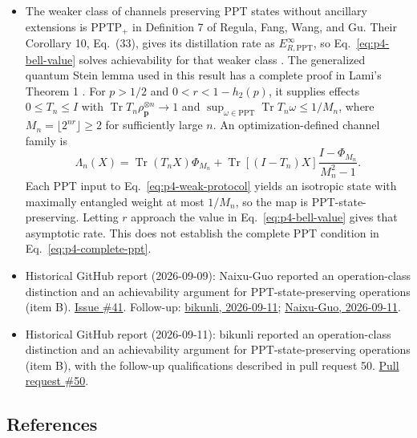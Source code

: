 \begin{itemize}
  \item The weaker class of channels preserving PPT states without ancillary
extensions is $\mathrm{PPTP}_+$ in Definition 7 of Regula, Fang, Wang,
and Gu. Their Corollary 10, Eq.~(33), gives its distillation rate as
$E_{R,\mathrm{PPT}}^\infty$, so Eq.~\eqref{eq:p4-bell-value} solves
achievability for that weaker class
.
The generalized quantum Stein lemma used in this result has a complete
proof in Lami's Theorem 1 .
For $p>1/2$ and $0<r<1-h_2(p)$, it supplies effects $0\leq T_n\leq I$
with $\operatorname{Tr}T_n\rho_{\mathbf p}^{\otimes n}\to1$ and
$\sup_{\omega\in\mathrm{PPT}}\operatorname{Tr}T_n\omega\leq1/M_n$,
where $M_n=\lfloor2^{nr}\rfloor\geq2$ for sufficiently large $n$.
An optimization-defined channel family is
\begin{equation}
  \Lambda_n(X)=\operatorname{Tr}(T_nX)\Phi_{M_n}
   +\operatorname{Tr}[(I-T_n)X]
        \frac{I-\Phi_{M_n}}{M_n^2-1}.
  \label{eq:p4-weak-protocol}
\end{equation}
Each PPT input to Eq.~\eqref{eq:p4-weak-protocol} yields an isotropic state
with maximally entangled weight at most $1/M_n$, so the map is
PPT-state-preserving. Letting $r$ approach the value in
Eq.~\eqref{eq:p4-bell-value} gives that asymptotic rate. This does not
establish the complete PPT condition in Eq.~\eqref{eq:p4-complete-ppt}.

  \item Historical GitHub report (2026-09-09): Naixu-Guo reported an operation-class distinction and an achievability argument for PPT-state-preserving operations (item B). \href{https://github.com/Naixu-Guo/quantum-open-problems/issues/41}{Issue \#41}. Follow-up: \href{https://github.com/Naixu-Guo/quantum-open-problems/issues/41#issuecomment-5628256055}{bikunli, 2026-09-11}; \href{https://github.com/Naixu-Guo/quantum-open-problems/issues/41#issuecomment-5628982142}{Naixu-Guo, 2026-09-11}.

  \item Historical GitHub report (2026-09-11): bikunli reported an operation-class distinction and an achievability argument for PPT-state-preserving operations (item B), with the follow-up qualifications described in pull request 50. \href{https://github.com/Naixu-Guo/quantum-open-problems/pull/50}{Pull request \#50}.
\end{itemize}

\subsection*{References}

